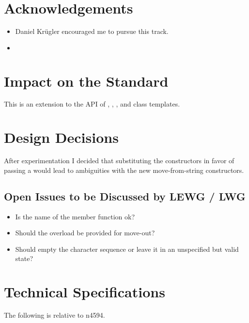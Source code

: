 \documentclass[ebook,11pt,article]{memoir}
\begin{document}
\chapter{Acknowledgements}
\begin{itemize}
\item Daniel Kr\"ugler encouraged me to pursue this track.
\item {}
\end{itemize}




\chapter{Impact on the Standard}
This is an extension to the API of , , , and  class templates.
\chapter{Design Decisions}
After experimentation I decided that substituting the  constructors in favor of passing a  would lead to ambiguities with the new move-from-string constructors.
\section{Open Issues to be Discussed by LEWG / LWG}
\begin{itemize}
\item Is the name of the  member function ok?
\item Should the  overload be provided for move-out?
\item Should  empty the character sequence or leave it in an unspecified but valid state?
\end{itemize}

\chapter{Technical Specifications}
The following is relative to n4594.
\end{document}
